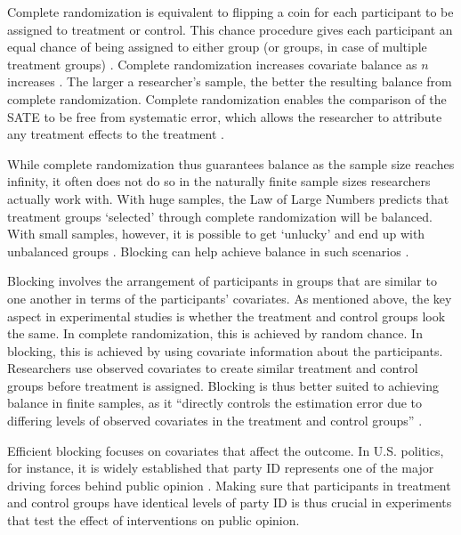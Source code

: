\documentclass[12pt,]{article}
\begin{document}
Complete randomization is equivalent to flipping a coin for each
participant to be assigned to treatment or control. This chance
procedure gives each participant an equal chance of being assigned to
either group (or groups, in case of multiple treatment groups)
\citep{lachin_1988_properties}. Complete randomization increases
covariate balance as \(n\) increases \citep{imai_2009_essential}. The
larger a researcher's sample, the better the resulting balance from
complete randomization. Complete randomization enables the comparison of
the SATE to be free from systematic error, which allows the researcher
to attribute any treatment effects to the treatment
\citep{king_a-politically_2007}.

While complete randomization thus guarantees balance as the sample size
reaches infinity, it often does not do so in the naturally finite sample
sizes researchers actually work with. With huge samples, the Law of
Large Numbers predicts that treatment groups `selected' through complete
randomization will be balanced. With small samples, however, it is
possible to get `unlucky' and end up with unbalanced groups
\citep{imai_2008_misunderstandings}. Blocking can help achieve balance
in such scenarios \citep{epstein_2002_rules}.

Blocking involves the arrangement of participants in groups that are
similar to one another in terms of the participants' covariates. As
mentioned above, the key aspect in experimental studies is whether the
treatment and control groups look the same. In complete randomization,
this is achieved by random chance. In blocking, this is achieved by
using covariate information about the participants. Researchers use
observed covariates to create similar treatment and control groups
before treatment is assigned. Blocking is thus better suited to
achieving balance in finite samples, as it ``directly controls the
estimation error due to differing levels of observed covariates in the
treatment and control groups'' \citep[p.~463]{moore_2012_multivariate}.

Efficient blocking focuses on covariates that affect the outcome. In
U.S. politics, for instance, it is widely established that party ID
represents one of the major driving forces behind public opinion
\citep{abramowitz_disappearing_2010, druckman_how_2013, fiorina_culture_2011, king_polarization_1997}.
Making sure that participants in treatment and control groups have
identical levels of party ID is thus crucial in experiments that test
the effect of interventions on public opinion.
\end{document}
